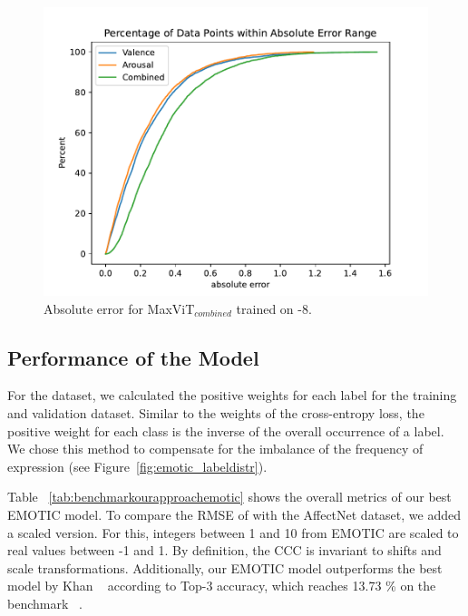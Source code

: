 \begin{figure}[t]
    \centering
    \includegraphics[width=0.95\columnwidth]{pictures/affectnet/inference_best_va_affectnet8.pdf}
    \caption{Absolute error for MaxViT$_{combined}$ trained on \affectnet{}-8.}
    \label{fig:affectnet_cdf}
\end{figure}


\subsection{Performance of the \emotic{} Model}
 
For the \emotic{} dataset, we calculated the positive weights for each label for the training and validation dataset. Similar to the weights of the cross-entropy loss, the positive weight for each class is the inverse of the overall occurrence of a label. We chose this method to compensate for the imbalance of the frequency of expression (see Figure~\ref{fig:emotic_labeldistr}). 

 Table ~\ref{tab:benchmarkourapproachemotic} shows the overall metrics of our best EMOTIC model. To compare the RMSE of \va{} with the AffectNet dataset, we added a scaled version. For this, integers between 1 and 10 from EMOTIC are scaled to real values between -1 and 1. By definition, the CCC is invariant to shifts and scale transformations. Additionally, our EMOTIC model outperforms the best model by Khan \etal ~\cite{khan2024focusclip} according to Top-3 accuracy, which reaches 13.73 \% on the benchmark ~\cite{paperswithcodeemotop3}. 

